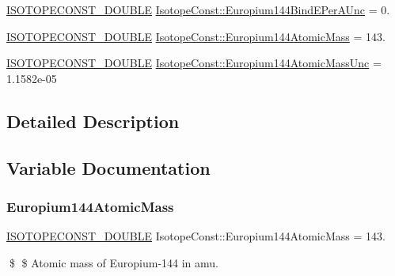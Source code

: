 \begin{DoxyCompactItemize}
\mbox{\hyperlink{group___isotope_const-_macros_ga8f45a7272ce02c0b4c65c44636ed719a}{I\+S\+O\+T\+O\+P\+E\+C\+O\+N\+S\+T\+\_\+\+D\+O\+U\+B\+LE}} \mbox{\hyperlink{group___isotope_const-_europium-_eu144_ga8b9f4eedad0b5a5d5ea273c45e83005d}{Isotope\+Const\+::\+Europium144\+Bind\+E\+Per\+A\+Unc}} = 0.
\item 
\mbox{\hyperlink{group___isotope_const-_macros_ga8f45a7272ce02c0b4c65c44636ed719a}{I\+S\+O\+T\+O\+P\+E\+C\+O\+N\+S\+T\+\_\+\+D\+O\+U\+B\+LE}} \mbox{\hyperlink{group___isotope_const-_europium-_eu144_ga8ab4601421421971f11d96b2fe269140}{Isotope\+Const\+::\+Europium144\+Atomic\+Mass}} = 143.
\item 
\mbox{\hyperlink{group___isotope_const-_macros_ga8f45a7272ce02c0b4c65c44636ed719a}{I\+S\+O\+T\+O\+P\+E\+C\+O\+N\+S\+T\+\_\+\+D\+O\+U\+B\+LE}} \mbox{\hyperlink{group___isotope_const-_europium-_eu144_gae19d8cb877ffb6f1d2f78523a2520776}{Isotope\+Const\+::\+Europium144\+Atomic\+Mass\+Unc}} = 1.\+1582e-\/05
\end{DoxyCompactItemize}


\subsection{Detailed Description}


\subsection{Variable Documentation}
\mbox{\label{group___isotope_const-_europium-_eu144_ga8ab4601421421971f11d96b2fe269140}} 
\subsubsection{\texorpdfstring{Europium144\+Atomic\+Mass}{Europium144AtomicMass}}
{\footnotesize\ttfamily \mbox{\hyperlink{group___isotope_const-_macros_ga8f45a7272ce02c0b4c65c44636ed719a}{I\+S\+O\+T\+O\+P\+E\+C\+O\+N\+S\+T\+\_\+\+D\+O\+U\+B\+LE}} Isotope\+Const\+::\+Europium144\+Atomic\+Mass = 143.}

\$ \$ Atomic mass of Europium-\/144 in amu. \mbox{\label{group___isotope_const-_europium-_eu144_gae19d8cb877ffb6f1d2f78523a2520776}} 
